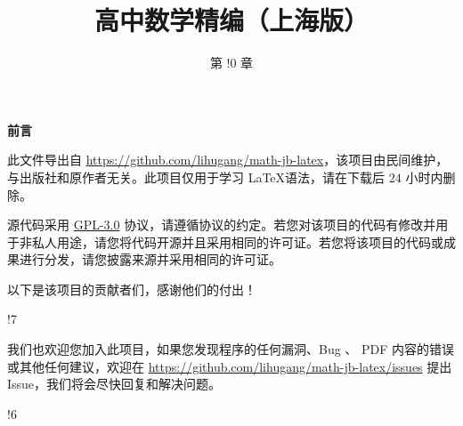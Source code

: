 \documentclass{article}
\title{高中数学精编（上海版）}
\author{第 $!0$ 章}
\begin{document}
\maketitle

\newpage

\pagestyle{fancy}
\renewcommand{\footrulewidth}{0pt}
\renewcommand{\headrulewidth}{0pt}
\fancyfoot[C]{\thepage}

\begin{center}
    \Large \textbf{前言}
\end{center}

此文件导出自 \url{https://github.com/lihugang/math-jb-latex}，该项目由民间维护，与出版社和原作者无关。此项目仅用于学习 \LaTeX 语法，请在下载后 $24$ 小时内删除。

源代码采用 \href{https://github.com/lihugang/math-jb-latex/blob/master/LICENSE}{GPL-3.0} 协议，请遵循协议的约定。若您对该项目的代码有修改并用于非私人用途，请您将代码开源并且采用相同的许可证。若您将该项目的代码或成果进行分发，请您披露来源并采用相同的许可证。

\vspace{0.5cm}

以下是该项目的贡献者们，感谢他们的付出！

!7

\vspace{0.5cm}

我们也欢迎您加入此项目，如果您发现程序的任何漏洞、Bug 、 PDF 内容的错误或其他任何建议，欢迎在 \url{https://github.com/lihugang/math-jb-latex/issues} 提出 Issue，我们将会尽快回复和解决问题。

\newpage

\tableofcontents

!6
\end{document}
